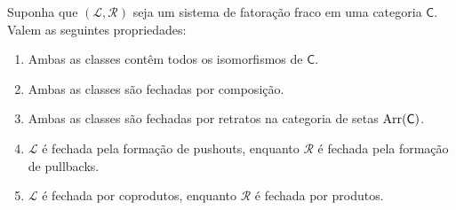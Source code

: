\begin{prop}\label{prop:propriedades_fatoracao_fraca}
  Suponha que $(\mathcal{L},\mathcal{R})$ seja um sistema de fatoração fraco em uma categoria $\mathsf{C}$.
  Valem as seguintes propriedades:
  \begin{enumerate}
  \item Ambas as classes contêm todos os isomorfismos de $\mathsf{C}$.
    
  \item Ambas as classes são fechadas por composição.
    
  \item Ambas as classes são fechadas por retratos na categoria de setas $\mathrm{Arr}(\mathsf{C})$.
    
  \item $\mathcal{L}$ é fechada pela formação de pushouts, enquanto $\mathcal{R}$ é fechada pela formação de pullbacks.
    
  \item $\mathcal{L}$ é fechada por coprodutos, enquanto $\mathcal{R}$ é fechada por produtos.
  \end{enumerate}
\end{prop}


